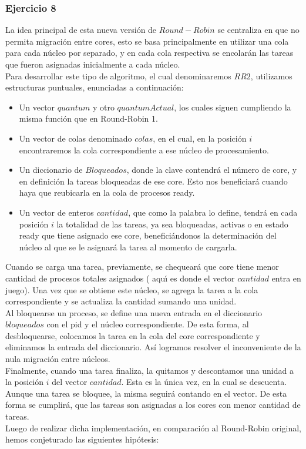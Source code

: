 \subsubsection[Resolución Ejercicio 8]{Ejercicio 8}

La idea principal de esta nueva versi\'{o}n de $Round-Robin$ se centraliza en que no permita migraci\'{o}n entre
cores, esto se basa principalmente en utilizar una cola para cada núcleo por separado, y en cada
cola respectiva se encolar\'{a}n las tareas que fueron asignadas inicialmente a cada n\'ucleo.\\
Para desarrollar este tipo de algoritmo, el cual denominaremos $RR2$, utilizamos estructuras
puntuales, enunciadas a continuación:\\
\begin{itemize}
 \item Un vector $quantum$ y otro $quantumActual$, los cuales siguen cumpliendo la misma funci\'{o}n que
 en Round-Robin 1.
 \item Un vector de colas denominado $colas$, en el cual, en la posición $i$ encontraremos la cola correspondiente
 a ese núcleo de procesamiento.
 \item Un diccionario de $Bloqueados$, donde la clave contendr\'{a} el número de core, y en definición
 la tareas bloqueadas de ese core. Esto nos beneficiar\'{a} cuando haya que reubicarla en la cola de procesos ready.
 \item Un vector de enteros $cantidad$, que como la palabra lo define, tendrá en cada posición $i$ 
 la totalidad de las tareas, ya sea bloqueadas, activas o en estado ready que tiene asignado ese core, benefici\'{a}ndonos
 la determinación del núcleo al que se le asignará la tarea al momento de cargarla.
\end{itemize}
Cuando se carga una tarea, previamente, se chequeará que core tiene menor cantidad de procesos totales asignados (
aqu\'{\i} es donde el vector $cantidad$ entra en juego). Una vez que se obtiene este n\'{u}cleo, se agrega 
la tarea a la cola correspondiente y se actualiza la cantidad sumando una unidad.\\
\indent Al bloquearse un proceso, se define una nueva entrada en el diccionario $bloqueados$ con el
pid y el n\'{u}cleo correspondiente. De esta forma, al desbloquearse, colocamos la tarea en la cola del core
correspondiente y eliminamos la entrada del diccionario. Así logramos resolver el inconveniente de la nula
migración entre n\'{u}cleos.\\
\indent Finalmente, cuando una tarea finaliza, la quitamos y descontamos una unidad a la posición $i$ del vector
$cantidad$. Esta es la única vez, en la cual se descuenta. Aunque una tarea se bloquee, la misma
seguirá contando en el vector. De esta forma se cumplirá, que las tareas son asignadas a los cores
con menor cantidad de tareas.\\
Luego de realizar dicha implementación, en comparación al Round-Robin original, hemos conjeturado 
las siguientes hipótesis:

